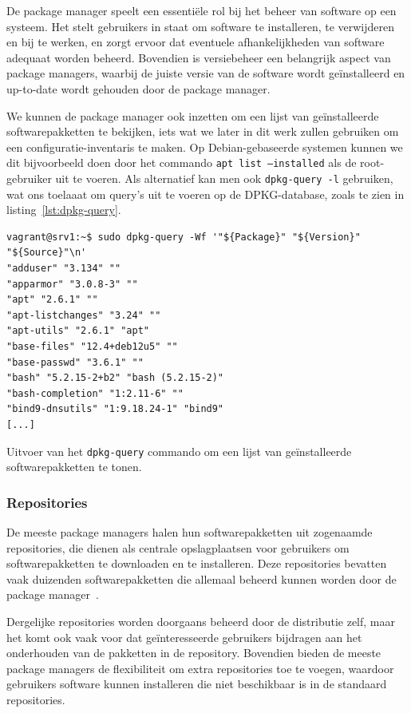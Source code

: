 De package manager speelt een essenti\"ele rol bij het beheer van software op een systeem.
Het stelt gebruikers in staat om software te installeren, te verwijderen en bij te werken, en zorgt ervoor dat eventuele afhankelijkheden van software adequaat worden beheerd.
Bovendien is versiebeheer een belangrijk aspect van package managers, waarbij de juiste versie van de software wordt ge\"installeerd en up-to-date wordt gehouden door de package manager.

We kunnen de package manager ook inzetten om een lijst van ge\"installeerde softwarepakketten te bekijken, iets wat we later in dit werk zullen gebruiken om een configuratie-inventaris te maken.
Op Debian-gebaseerde systemen kunnen we dit bijvoorbeeld doen door het commando \texttt{apt list --installed} als de root-gebruiker uit te voeren.
Als alternatief kan men ook \texttt{dpkg-query -l} gebruiken, wat ons toelaaat om query's uit te voeren op de DPKG-database, zoals te zien in listing~\ref{lst:dpkg-query}.

\begin{listing}
  \begin{verbatim}
vagrant@srv1:~$ sudo dpkg-query -Wf '"${Package}" "${Version}" "${Source}"\n'
"adduser" "3.134" ""
"apparmor" "3.0.8-3" ""
"apt" "2.6.1" ""
"apt-listchanges" "3.24" ""
"apt-utils" "2.6.1" "apt"
"base-files" "12.4+deb12u5" ""
"base-passwd" "3.6.1" ""
"bash" "5.2.15-2+b2" "bash (5.2.15-2)"
"bash-completion" "1:2.11-6" ""
"bind9-dnsutils" "1:9.18.24-1" "bind9"
[...]
  \end{verbatim}
  \caption{Uitvoer van het \texttt{dpkg-query} commando om een lijst van ge\"installeerde softwarepakketten te tonen.}
  \label{lst:dpkg-query}
\end{listing}

\subsubsection{Repositories}
\label{linux_repositories}

De meeste package managers halen hun softwarepakketten uit zogenaamde repositories, die dienen als centrale opslagplaatsen voor gebruikers om softwarepakketten te downloaden en te installeren.
Deze repositories bevatten vaak duizenden softwarepakketten die allemaal beheerd kunnen worden door de package manager~\autocite{shotts2019linux}.

Dergelijke repositories worden doorgaans beheerd door de distributie zelf, maar het komt ook vaak voor dat ge\"interesseerde gebruikers bijdragen aan het onderhouden van de pakketten in de repository.
Bovendien bieden de meeste package managers de flexibiliteit om extra repositories toe te voegen, waardoor gebruikers software kunnen installeren die niet beschikbaar is in de standaard repositories.

